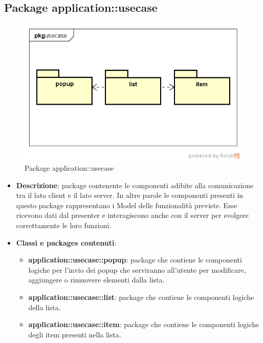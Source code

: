 \subsection{Package application::usecase}
\label{Package application::usecase}
\begin{figure}[H]
	\centering
	\includegraphics[scale=0.6]{Sezioni/Packages/App/pck_usecase.png}
	\caption{Package application::usecase}
\end{figure}
\begin{itemize}
\item \textbf{Descrizione}: package contenente le componenti adibite alla comunicazione tra il lato client e il lato server. In altre parole le componenti presenti in questo package rappresentano i Model delle funzionalità previste. Esse ricevono dati dal presenter e interagiscono anche con il server per svolgere correttamente le loro funzioni.
\item \textbf{Classi e packages contenuti}:
\begin{itemize}
\item \textbf{application::usecase::popup}: package che contiene le componenti logiche per l'invio dei popup che serviranno all'utente per modificare, aggiungere o rimuovere elementi dalla lista.
\item \textbf{application::usecase::list}: package che contiene le componenti logiche della lista.
\item \textbf{application::usecase::item}: package che contiene le componenti logiche degli item presenti nella lista.
\end{itemize}
\end{itemize}

